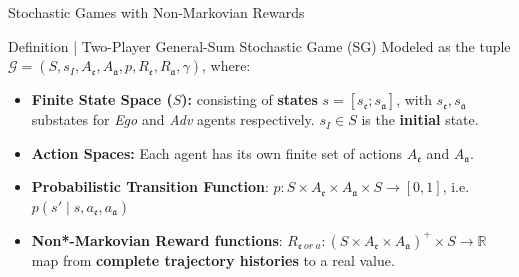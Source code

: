 \documentclass[10pt, aspectratio=169]{beamer}
\newcommand{\evidenzia}[1]{\textcolor{verdeSalvia}{\textbf{#1}}}
\begin{document}
\begin{frame}{Stochastic Games with Non-Markovian Rewards}
    \vspace{0.7cm}
    \begin{block}{Definition | Two-Player General-Sum Stochastic Game (SG)}
        \vspace{0.2cm}
        Modeled as the tuple $\mathcal{G}=(S,s_{I},A_{\mathfrak{e}},A_{\mathfrak{a}},p,R_{\mathfrak{e}},R_{\mathfrak{a}},\gamma)$, where:
        \begin{itemize}
            \item \textbf{Finite State Space ($S$):} consisting of \evidenzia{states} $s=[s_{\mathfrak{e}};s_{\mathfrak{a}}]$, with $s_{\mathfrak{e}}, s_{\mathfrak{a}}$ substates for \textit{Ego} and \textit{Adv} agents respectively. $s_{I}\in S$ is the \evidenzia{initial} state.%
            \item \textbf{Action Spaces:} Each agent has its own finite set of actions $A_{\mathfrak{e}}$ and $A_{\mathfrak{a}}$.
            \item \textbf{Probabilistic Transition Function}: $p:S\times A_{\mathfrak{e}}\times A_{\mathfrak{a}}\times S\rightarrow[0,1]$, i.e. $p(s'\mid s, a_{\mathfrak{e}}, a_{\mathfrak{a}})$ %
            \item \textbf{Non*-Markovian Reward functions}: $R_{\mathfrak{e} \ or\ a} : (S\times A_{\mathfrak{e}}\times A_{\mathfrak{a}})^{+}\times S\rightarrow\mathbb{R}$ map from \evidenzia{complete trajectory histories} %
            to a real value.%
        \end{itemize}
    \end{block}
    \vspace{0.2cm}{\footnotesize (*) Usual definition assumes system Markovianity.}
\end{frame}
\end{document}
